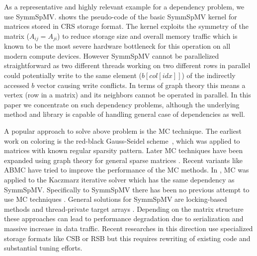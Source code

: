 As a representative and highly relevant example for a \DTWO dependency problem, we use \acrfull{SymmSpMV}. 
 shows the pseudo-code of the basic \acrshort{SymmSpMV} kernel 
for matrices stored in \acrfull{CRS} \cite{CRS} storage format. The kernel exploits the symmetry
of the matrix ($A_{ij} = A_{ji}$) to reduce storage size and overall 
memory traffic which is known to be the most severe hardware bottleneck for this operation on all modern compute devices.  
However \acrshort{SymmSpMV} cannot be parallelized straightforward as two 
different threads working on two different rows in parallel could potentially 
write to the same element ($b[col[idx]]$) of the indirectly accessed $b$ vector
causing write conflicts.
In terms of graph theory this means a vertex (row in a matrix) and 
its \DTWO neighbors \cite{dist_k_def} cannot be operated in parallel.
In this paper we concentrate on such \DTWO dependency problems, although 
the underlying method and library is capable of handling 
general case of \DK dependencies as well.


A popular approach to solve above problem is the
\acrfull{MC} technique. The earliest work on coloring is the red-black 
Gauss-Seidel scheme~\cite{RBGS}, which was applied to  matrices with
 known regular sparsity pattern. 
Later \acrlong{MC} techniques have been expanded using graph theory
for general sparse matrices \cite{MC, COLPACK}.
Recent variants like \acrfull{ABMC} \cite{ABMC} have tried to improve the performance 
of the \acrshort{MC} methods. 
In \cite{feast_mc}, \acrshort{MC} was applied to the Kaczmarz iterative solver \cite{kaczmarz}
 which has the same \DTWO dependency as \acrshort{SymmSpMV}.
Specifically to \acrshort{SymmSpMV} there has been no previous attempt to use 
\acrlong{MC} techniques . General solutions for \acrshort{SymmSpMV} are 
locking-based methods and thread-private target arrays \cite{sparseX,thread_private_symm_spmv}.
Depending on the matrix structure these approaches can lead to performance
 degradation  due to serialization and massive increase in data traffic.
Recent researches in this direction use specialized storage formats like
 CSB \cite{CSB} or RSB \cite{RSB} but this requires rewriting of existing 
 code and substantial tuning efforts. 

 
